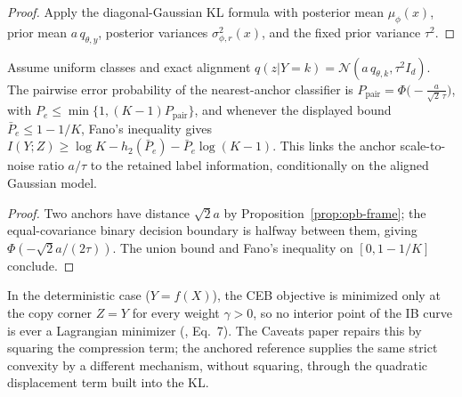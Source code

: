 \begin{proof}
Apply the diagonal-Gaussian KL formula with posterior mean $\mu_\phi(x)$, prior mean
$a\,q_{\theta,y}$, posterior variances $\sigma_{\phi,r}^2(x)$, and the fixed prior
variance $\tau^2$.
\end{proof}

\begin{corollary}
\label{cor:opb-fano}
Assume uniform classes and exact alignment
$q(z|Y=k) = \mathcal{N}(a\,q_{\theta,k}, \tau^2 I_d)$. The pairwise error probability
of the nearest-anchor classifier is
$P_{\mathrm{pair}} = \Phi\bigl(-\frac{a}{\sqrt{2}\,\tau}\bigr)$, with
$P_e \le \min\{1, (K-1)P_{\mathrm{pair}}\}$, and whenever the displayed bound
$\bar P_e \le 1 - 1/K$, Fano's inequality gives
$I(Y;Z) \ge \log K - h_2(\bar P_e) - \bar P_e \log(K-1)$. This links the anchor
scale-to-noise ratio $a/\tau$ to the retained label information, conditionally on the
aligned Gaussian model.
\end{corollary}

\begin{proof}
Two anchors have distance $\sqrt{2}a$ by Proposition~\ref{prop:opb-frame}; the
equal-covariance binary decision boundary is halfway between them, giving
$\Phi(-\sqrt{2}a/(2\tau))$. The union bound and Fano's inequality on
$[0, 1-1/K]$ conclude.
\end{proof}

In the deterministic case ($Y=f(X)$), the CEB objective is minimized only at the
copy corner $Z=Y$ for every weight $\gamma>0$, so no interior point of the IB curve
is ever a Lagrangian minimizer (\citealp{kolchinsky2019caveats}, Eq.~7). The Caveats
paper repairs this by squaring the compression term; the anchored reference supplies
the same strict convexity by a different mechanism, without squaring, through the
quadratic displacement term built into the KL.

